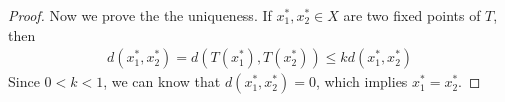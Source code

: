 \documentclass[12pt,leqno]{amsart}
\theoremstyle{definition}
\numberwithin{equation}{subsection}
\begin{document}
\begin{proof}
Now we prove the the uniqueness. If $x_1^*, x_2^*\in X$ are two fixed points of $T$, then 
\begin{align*}
    d\left(x_1^*, x_2^*\right) = d\left(T(x_1^*), T(x_2^*)\right) \leq k d(x_1^*, x_2^*)
\end{align*}
Since $0<k<1$, we can know that $d(x_1^*, x_2^*) = 0$, which implies $x_1^* = x_2^*$.
\end{proof}
\end{document}
